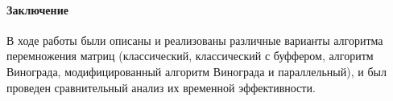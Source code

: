 \documentclass[utf8x, 12pt]{G7-32} %
\begin{document}
\paragraph{Заключение}

В ходе работы были описаны и реализованы различные варианты алгоритма перемножения матриц (классический, классический с буффером, алгоритм Винограда, модифицированный алгоритм Винограда и параллельный), и был проведен сравнительный анализ их временной эффективности.

\backmatter %

\appendix   %
\end{document}
